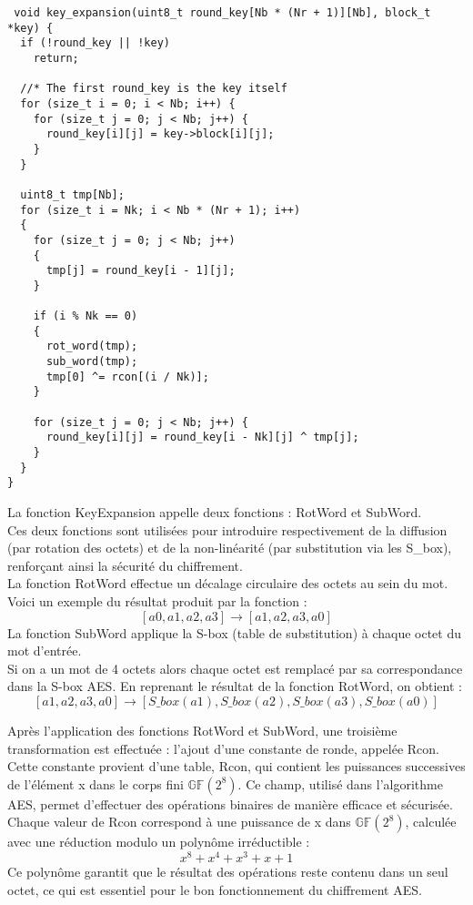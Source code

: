 \documentclass[a4paper, 10pt]{article}
\begin{document}
\small{
\begin{verbatim}
 void key_expansion(uint8_t round_key[Nb * (Nr + 1)][Nb], block_t *key) {
  if (!round_key || !key)
    return;

  //* The first round_key is the key itself
  for (size_t i = 0; i < Nb; i++) {
    for (size_t j = 0; j < Nb; j++) {
      round_key[i][j] = key->block[i][j];
    }
  }

  uint8_t tmp[Nb];
  for (size_t i = Nk; i < Nb * (Nr + 1); i++) 
  {
    for (size_t j = 0; j < Nb; j++) 
    {
      tmp[j] = round_key[i - 1][j];
    }

    if (i % Nk == 0) 
    {
      rot_word(tmp);
      sub_word(tmp);
      tmp[0] ^= rcon[(i / Nk)];
    }

    for (size_t j = 0; j < Nb; j++) {
      round_key[i][j] = round_key[i - Nk][j] ^ tmp[j];
    }
  }
}
\end{verbatim}
}
\normalsize
La fonction KeyExpansion appelle deux fonctions : RotWord et SubWord.\\
Ces deux fonctions sont utilisées pour introduire respectivement de la diffusion (par rotation des 
octets) et de la non-linéarité (par substitution via les S\_box), renforçant ainsi la sécurité 
du chiffrement.\\
\indent La fonction RotWord effectue un décalage circulaire des octets au sein du mot. Voici un exemple du résultat produit par la fonction :
\[[a0, a1, a2, a3] \rightarrow [a1, a2, a3, a0] \]
La fonction SubWord applique la S-box (table de substitution) à chaque octet du mot d'entrée.\\
Si on a un mot de 4 octets alors chaque octet est remplacé par sa correspondance dans la S-box AES.
En reprenant le résultat de la fonction RotWord, on obtient :
\[[a1, a2, a3, a0] \rightarrow [S\_box(a1), S\_box(a2), S\_box(a3), S\_box(a0)] \]

Après l’application des fonctions RotWord et SubWord, une troisième transformation est effectuée : l’ajout d’une constante de ronde, 
appelée Rcon.
Cette constante provient d’une table, Rcon, qui contient les puissances successives de l’élément x dans le corps fini $\mathbb{GF}(2^8)$.
Ce champ, utilisé dans l’algorithme AES, permet d’effectuer des opérations binaires de manière efficace et sécurisée. 
Chaque valeur de Rcon correspond à une puissance de x dans $\mathbb{GF}(2^8)$, calculée avec une réduction modulo un polynôme irréductible :
\[x^8 +x^4 +x^3+x+1\]
Ce polynôme garantit que le résultat des opérations reste contenu dans un seul octet, 
ce qui est essentiel pour le bon fonctionnement du chiffrement AES.
\end{document}

